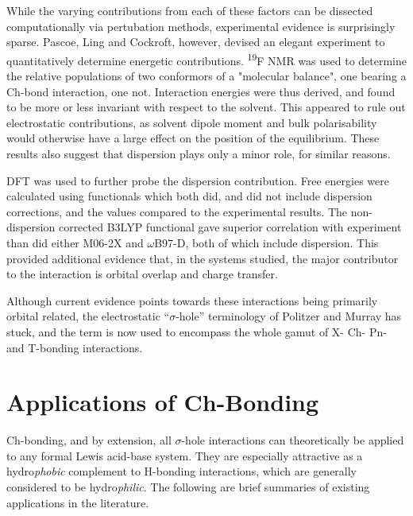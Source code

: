 \begin{refsection}
While the varying contributions from each of these factors can be dissected computationally via pertubation methods, experimental evidence is surprisingly sparse.
Pascoe, Ling and Cockroft, however, devised an elegant experiment to quantitatively determine energetic contributions.\autocite{Pascoe2017}
\textsuperscript{19}F NMR was used to determine the relative populations of two conformors of a "molecular balance", one bearing a Ch-bond interaction, one not.
Interaction energies were thus derived, and found to be more or less invariant with respect to the solvent.
This appeared to rule out electrostatic contributions, as solvent dipole moment and bulk polarisability would otherwise have a large effect on the position of the equilibrium.
These results also suggest that dispersion plays only a minor role, for similar reasons.

DFT was used to further probe the dispersion contribution.
Free energies were calculated using functionals which both did, and did not include dispersion corrections, and the values compared to the experimental results.
The non-dispersion corrected B3LYP functional gave superior correlation with experiment than did either M06-2X and $\omega$B97-D, both of which include dispersion.
This provided additional evidence that, in the systems studied, the major contributor to the interaction is orbital overlap and charge transfer.

Although current evidence points towards these interactions being primarily orbital related, the electrostatic ``$\sigma$-hole'' terminology of Politzer and Murray has stuck, and the term is now used to encompass the whole gamut of X- Ch- Pn- and T-bonding interactions.

\section{Applications of Ch-Bonding}
Ch-bonding, and by extension, all $\sigma$-hole interactions can theoretically be applied to any formal Lewis acid-base system.
They are especially attractive as a hydro\emph{phobic} complement to H-bonding interactions, which are generally considered to be hydro\emph{philic}.
The following are brief summaries of existing applications in the literature.


\end{refsection}
